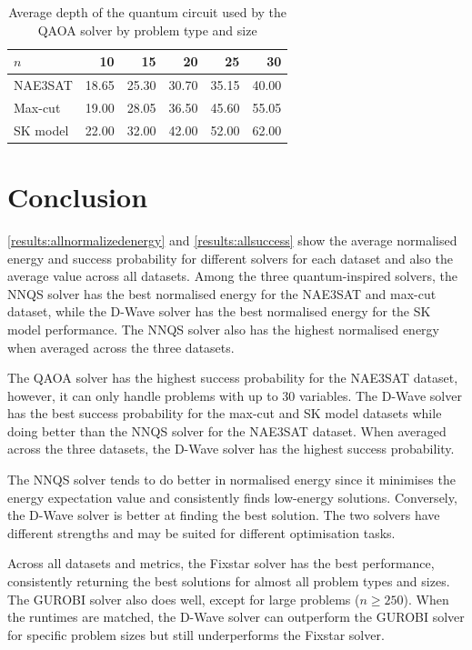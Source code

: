\begin{table}[!htb]
    \centering
    \begin{tabular}{lrrrrr} \toprule
        $n$ & 10 & 15 & 20 & 25 & 30\\ \midrule
        NAE3SAT & 18.65 & 25.30 & 30.70 & 35.15 & 40.00 \\
        Max-cut & 19.00 & 28.05 & 36.50 & 45.60 & 55.05 \\
        SK model & 22.00 & 32.00 & 42.00 & 52.00 & 62.00\\ \bottomrule
    \end{tabular}
    \caption{Average depth of the quantum circuit used by the QAOA solver by problem type and size}
    \label{table:depth}
\end{table}

\section{Conclusion}
\autoref{results:allnormalizedenergy} and \autoref{results:allsuccess} show the average normalised energy and success probability for different solvers for each dataset and also the average value across all datasets. Among the three quantum-inspired solvers, the NNQS solver has the best normalised energy for the NAE3SAT and max-cut dataset, while the D-Wave solver has the best normalised energy for the SK model performance. The NNQS solver also has the highest normalised energy when averaged across the three datasets. 

The QAOA solver has the highest success probability for the NAE3SAT dataset, however, it can only handle problems with up to $30$ variables. The D-Wave solver has the best success probability for the max-cut and SK model datasets while doing better than the NNQS solver for the NAE3SAT dataset. When averaged across the three datasets, the D-Wave solver has the highest success probability.

The NNQS solver tends to do better in normalised energy since it minimises the energy expectation value and consistently finds low-energy solutions. Conversely, the D-Wave solver is better at finding the best solution. The two solvers have different strengths and may be suited for different optimisation tasks.

Across all datasets and metrics, the Fixstar solver has the best performance, consistently returning the best solutions for almost all problem types and sizes. The GUROBI solver also does well, except for large problems ($n\geq 250$). When the runtimes are matched, the D-Wave solver can outperform the GUROBI solver for specific problem sizes but still underperforms the Fixstar solver. 

